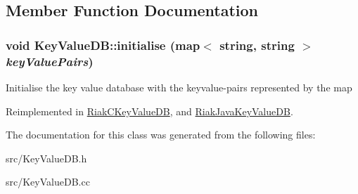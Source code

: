 \subsection{Member Function Documentation}
\hypertarget{classKeyValueDB_aebd32f35aa2c11ac0d071bd8307fc521}{
\subsubsection[{initialise}]{\setlength{\rightskip}{0pt plus 5cm}void KeyValueDB::initialise (map$<$ string, string $>$ {\em keyValuePairs})}}
\label{classKeyValueDB_aebd32f35aa2c11ac0d071bd8307fc521}
Initialise the key value database with the keyvalue-\/pairs represented by the map 

Reimplemented in \hyperlink{classRiakCKeyValueDB_ac57a6fe1e7b1d5759dcb43915d4f65da}{RiakCKeyValueDB}, and \hyperlink{classRiakJavaKeyValueDB_aa7e3df85b19f2c3a936a7282f8ddb98f}{RiakJavaKeyValueDB}.

The documentation for this class was generated from the following files:\begin{DoxyCompactItemize}
\item 
src/KeyValueDB.h\item 
src/KeyValueDB.cc\end{DoxyCompactItemize}
